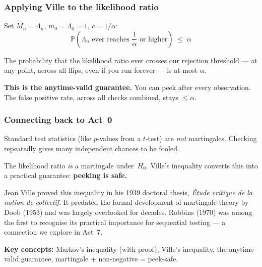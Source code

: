 \documentclass[12pt, a4paper]{article}
\newcommand{\Prob}{\mathbb{P}}         %
\newcommand{\LR}{\Lambda}              %
\begin{document}
\subsubsection*{Applying Ville to the likelihood ratio}

Set $M_n = \LR_n$, $m_0 = \LR_0 = 1$, $c = 1/\alpha$:
\[
  \boxed{\Prob\!\left(\LR_n \text{ ever reaches } \frac{1}{\alpha}
         \text{ or higher}\right) \;\leq\; \alpha}
\]

\begin{plainlanguage}
The probability that the likelihood ratio ever crosses our rejection
threshold --- at any point, across all flips, even if you run forever ---
is at most $\alpha$.

\textbf{This is the anytime-valid guarantee.}  You can peek after every
observation.  The false positive rate, across all checks combined, stays
$\leq \alpha$.
\end{plainlanguage}

\subsubsection*{Connecting back to Act~0}

Standard test statistics (like $p$-values from a $t$-test) are \emph{not}
martingales.  Checking repeatedly gives many independent chances to be fooled.

The likelihood ratio \emph{is} a martingale under~$H_0$.  Ville's inequality
converts this into a practical guarantee: \textbf{peeking is safe.}

\begin{historynote}
Jean Ville proved this inequality in his 1939 doctoral thesis,
\textit{\'Etude critique de la notion de collectif}.  It predated the formal
development of martingale theory by Doob (1953) and was largely overlooked
for decades.  Robbins (1970) was among the first to recognise its practical
importance for sequential testing --- a connection we explore in Act~7.
\end{historynote}

\begin{keytakeaway}
\textbf{Key concepts:} Markov's inequality (with proof), Ville's inequality,
the anytime-valid guarantee, martingale + non-negative = peek-safe.
\end{keytakeaway}


\newpage
\end{document}
